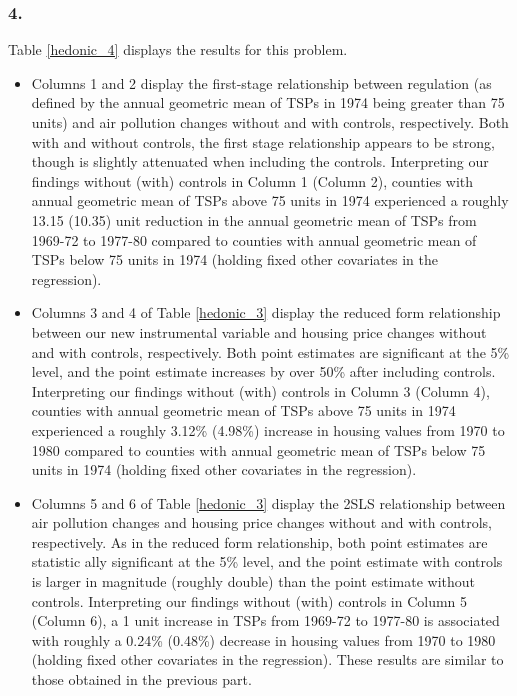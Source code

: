 \documentclass[12pt]{article}
\begin{document}
\subsubsection*{4.}
Table \ref{hedonic_4} displays the results for this problem.

\begin{itemize}
\item Columns 1 and 2 display the first-stage relationship between regulation (as defined by the annual geometric mean of TSPs in 1974 being greater than 75 units) and air pollution changes without and with controls, respectively. Both with and without controls, the first stage relationship appears to be strong, though is slightly attenuated when including the controls. Interpreting our findings without (with) controls in Column 1 (Column 2), counties with annual geometric mean of TSPs above 75 units in 1974 experienced a roughly 13.15 (10.35) unit reduction in the annual geometric mean of TSPs from 1969-72 to 1977-80 compared to counties with annual geometric mean of TSPs below 75 units in 1974 (holding fixed other covariates in the regression).

\item Columns 3 and 4 of Table \ref{hedonic_3} display the reduced form relationship between our new instrumental variable and housing price changes without and with controls, respectively. Both point estimates are significant at the 5\% level, and the point estimate increases by over 50\% after including controls. Interpreting our findings without (with) controls in Column 3 (Column 4), counties with annual geometric mean of TSPs above 75 units in 1974 experienced a roughly 3.12\% (4.98\%) increase in housing values from 1970 to 1980 compared to counties with annual geometric mean of TSPs below 75 units in 1974 (holding fixed other covariates in the regression).

\item Columns 5 and 6 of Table \ref{hedonic_3} display the 2SLS relationship between air pollution changes and housing price changes without and with controls, respectively. As in the reduced form relationship, both point estimates are statistic ally significant at the 5\% level, and the point estimate with controls is larger in magnitude (roughly double) than the point estimate without controls. Interpreting our findings without (with) controls in Column 5 (Column 6), a 1 unit increase in TSPs from 1969-72 to 1977-80 is associated with roughly a 0.24\% (0.48\%) decrease in housing values from 1970 to 1980 (holding fixed other covariates in the regression). These results are similar to those obtained in the previous part.
\end{itemize}
\end{document}
